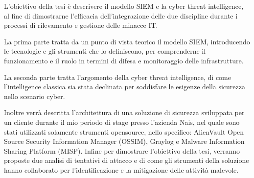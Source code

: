 \documentclass[corpo=11pt,numerazioneromana]{toptesi}
\begin{document}



\frontmatter









\abstract
L’obiettivo della tesi è descrivere il modello SIEM e la cyber threat intelligence, al fine di dimostrarne l’efficacia dell’integrazione delle due discipline durante i processi di rilevamento e gestione delle minacce IT.\par
La prima parte tratta da un punto di vista teorico il modello SIEM, introducendo le tecnologie e gli strumenti che lo definiscono, per comprenderne il funzionamento e il ruolo in termini di difesa e monitoraggio delle infrastrutture.\par
La seconda parte tratta l’argomento della cyber threat intelligence, di come l’intelligence classica sia stata declinata per soddisfare le esigenze della sicurezza nello scenario cyber.\par
Inoltre verrà descritta l'architettura di una soluzione di sicurezza sviluppata per un cliente durante il mio periodo di stage presso l'azienda Nais, nel quale sono stati utilizzati solamente strumenti opensource, nello specifico: AlienVault Open Source Security Information Manager (OSSIM), Graylog e Malware Information Sharing Platform (MISP). Infine per dimostrare l’obiettivo della tesi, verranno proposte due analisi di tentativi di attacco e di come gli strumenti della soluzione hanno collaborato per l’identificazione e la mitigazione delle attività malevole.\par
\end{document}

